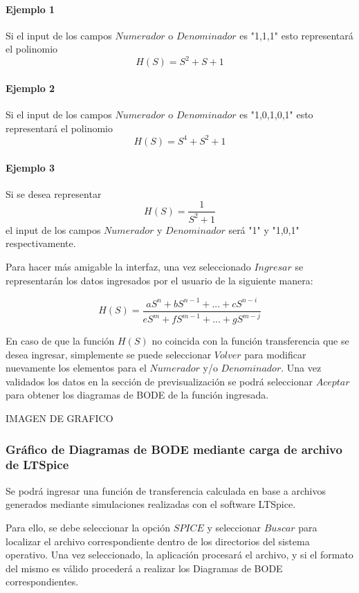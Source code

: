 \paragraph{Ejemplo 1}

Si el input de los campos $Numerador$ o $Denominador$ es "1,1,1" esto representará el polinomio  $$H(S) = S^2 + S + 1 $$

\paragraph{Ejemplo 2}

Si el input de los campos $Numerador$ o $Denominador$ es "1,0,1,0,1" esto representará el polinomio  $$H(S) = S^4 + S^2 + 1 $$

\paragraph{Ejemplo 3}

Si se desea representar $$H(S) = \frac{1}{S^2 + 1} $$el input de los campos $Numerador$ y $Denominador$ será "1" y "1,0,1" respectivamente.

Para hacer más amigable la interfaz, una vez seleccionado $Ingresar$ se representarán los datos ingresados por el usuario de la siguiente manera:

$$H(S) = \frac{aS^n + bS^{n-1}+ ... +cS^{n-i}}{eS^m + fS^{m-1}+ ... +gS^{m-j}} $$

En caso de que la función $H(S)$ no coincida con la función transferencia que se desea ingresar, simplemente se puede seleccionar $Volver$ para modificar nuevamente los elementos para el $Numerador$ y/o $Denominador$. 
Una vez validados los datos en la sección de previsualización se podrá seleccionar $Aceptar$ para obtener los diagramas de BODE de la función ingresada.

IMAGEN DE GRAFICO

\subsubsection{Gráfico de Diagramas de BODE mediante carga de archivo de LTSpice}

Se podrá ingresar una función de transferencia calculada en base a archivos generados mediante simulaciones realizadas con el software LTSpice.

Para ello, se debe seleccionar la opción $SPICE$ y seleccionar $Buscar$ para localizar el archivo correspondiente dentro de los directorios del sistema operativo. 
Una vez seleccionado, la aplicación procesará el archivo, y si el formato del mismo es válido procederá a realizar los Diagramas de BODE correspondientes.

